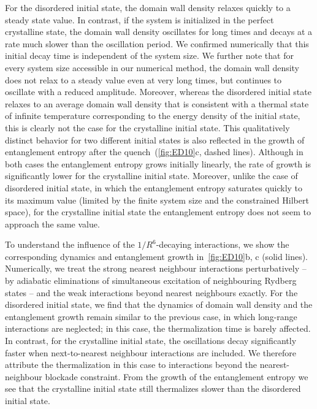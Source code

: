 \documentclass[prl,nobalancelastpage,twocolumn,superscriptaddress,nofootinbib]{revtex4}
\begin{document}
\begin{footnotesize}
For the disordered initial state, the domain wall density relaxes quickly to a
steady state value. In contrast, if the system is initialized in the perfect
crystalline state, the domain wall density oscillates for long times and decays
at a rate much slower than the oscillation period. We confirmed numerically
that this initial decay time is independent of the system size. We further note
that for every system size accessible in our numerical method, the domain wall
density does not relax to a steady value even at very long times, but continues
to oscillate with a reduced amplitude. Moreover, whereas the disordered initial
state relaxes to an average domain wall density that is consistent with a thermal state
of infinite temperature corresponding to the energy density of the initial
state, this is clearly not the case for the crystalline initial state. This
qualitatively distinct behavior for two different initial states is also
reflected in the growth of entanglement entropy after the
quench~(\ref{fig:ED10}c, dashed lines). Although in both cases the entanglement
entropy grows initially linearly, the rate of growth is significantly lower for
the crystalline initial state. Moreover, unlike the case of disordered initial
state, in which the entanglement entropy saturates quickly to its maximum value
(limited by the finite system size and the constrained Hilbert space), for the
crystalline initial state the entanglement entropy does not seem to approach
the same value.

To understand the influence of the $1/R^6$-decaying interactions, we show the
corresponding dynamics and entanglement growth in~\ref{fig:ED10}b, c (solid
lines). Numerically, we treat the strong nearest neighbour interactions
perturbatively -- by adiabatic eliminations of simultaneous excitation of
neighbouring Rydberg states -- and the weak interactions beyond nearest
neighbours exactly. For the disordered initial state, we find that
the dynamics of domain wall density and the entanglement growth remain similar
to the previous case, in which long-range interactions are neglected; in this
case, the thermalization time is barely affected.  In contrast, for the
crystalline initial state, the oscillations decay significantly faster when
next-to-nearest neighbour interactions are included. We therefore attribute the
thermalization in this case to interactions beyond the nearest-neighbour
blockade constraint. From the growth of the entanglement entropy we see that
the crystalline initial state still thermalizes slower than the disordered
initial state.



\end{footnotesize}
\end{document}
